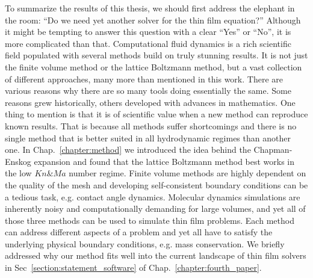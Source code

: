 To summarize the results of this thesis, we should first address the elephant in the room: ``Do we need yet another solver for the thin film equation?''
Although it might be tempting to answer this question with a clear ``Yes'' or ``No'', it is more complicated than that.
Computational fluid dynamics is a rich scientific field populated with several methods build on truly stunning results.
It is not just the finite volume method or the lattice Boltzmann method, but a vast collection of different approaches, many more than mentioned in this work.
There are various reasons why there are so many tools doing essentially the same. 
Some reasons grew historically, others developed with advances in mathematics.
One thing to mention is that it is of scientific value when a new method can reproduce known results.
That is because all methods suffer shortcomings and there is no single method that is better suited in all hydrodynamic regimes than another one.
In Chap.~\ref{chapter:method} we introduced the idea behind the Chapman-Enskog expansion and found that the lattice Boltzmann method best works in the low $Kn \& Ma$ number regime.
Finite volume methods are highly dependent on the quality of the mesh and developing self-consistent boundary conditions can be a tedious task, e.g. contact angle dynamics.
Molecular dynamics simulations are inherently noisy and computationally demanding for large volumes, and yet all of those three methods can be used to simulate thin film problems.
Each method can address different aspects of a problem and yet all have to satisfy the underlying physical boundary conditions, e.g. mass conservation.
We briefly addressed why our method fits well into the current landscape of thin film solvers in Sec~\ref{section:statement_software} of Chap.~\ref{chapter:fourth_paper}.

